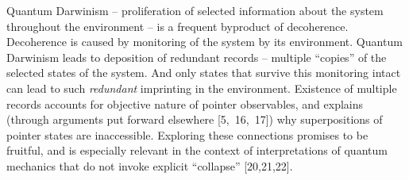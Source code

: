 \documentclass[aps,twocolumn,pra]{revtex4}
\newcommand{\+}         {\dagger}
\begin{document}
Quantum Darwinism -- proliferation of selected information about the system throughout 
the environment -- is a frequent byproduct of decoherence. Decoherence is caused by monitoring of 
the system by its environment. Quantum Darwinism leads to deposition of redundant records -- multiple ``copies'' of the selected states of the system. And only states that survive this monitoring intact can lead to such {\it redundant} imprinting in the environment.
Existence of multiple records accounts for objective nature of pointer observables, and explains (through arguments put forward elsewhere [5,~16,~17]) why superpositions of pointer states are inaccessible.
Exploring these connections promises to be fruitful, and is especially relevant in the context of interpretations of quantum mechanics that do not invoke explicit ``collapse'' [20,21,22]. 
\end{document}
